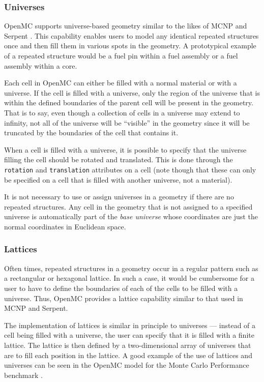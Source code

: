 \subsubsection{Universes}

OpenMC supports universe-based geometry similar to the likes of MCNP
\cite{lanl-x5-2008} and Serpent \cite{vtt-leppanen-2007}. This capability
enables users to model any identical repeated structures once and then fill them
in various spots in the geometry. A prototypical example of a repeated structure
would be a fuel pin within a fuel assembly or a fuel assembly within a core.

Each cell in OpenMC can either be filled with a normal material or with a
universe. If the cell is filled with a universe, only the region of the universe
that is within the defined boundaries of the parent cell will be present in the
geometry. That is to say, even though a collection of cells in a universe may
extend to infinity, not all of the universe will be ``visible'' in the geometry
since it will be truncated by the boundaries of the cell that contains it.

When a cell is filled with a universe, it is possible to specify that the
universe filling the cell should be rotated and translated. This is done through
the \texttt{rotation} and \texttt{translation} attributes on a cell (note though
that these can only be specified on a cell that is filled with another universe,
not a material).

It is not necessary to use or assign universes in a geometry if there are no
repeated structures. Any cell in the geometry that is not assigned to a
specified universe is automatically part of the \emph{base universe} whose
coordinates are just the normal coordinates in Euclidean space.

\subsubsection{Lattices}

Often times, repeated structures in a geometry occur in a regular pattern such
as a rectangular or hexagonal lattice. In such a case, it would be cumbersome
for a user to have to define the boundaries of each of the cells to be filled
with a universe. Thus, OpenMC provides a lattice capability similar to that used
in MCNP and Serpent.

The implementation of lattices is similar in principle to universes --- instead
of a cell being filled with a universe, the user can specify that it is filled
with a finite lattice. The lattice is then defined by a two-dimensional array of
universes that are to fill each position in the lattice. A good example of the
use of lattices and universes can be seen in the OpenMC model for the Monte
Carlo Performance benchmark \cite{romano-2012}.

